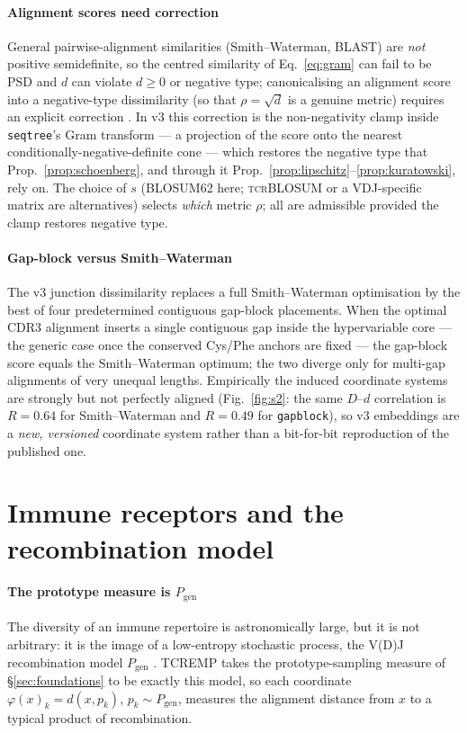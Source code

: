\documentclass[11pt]{article}
\theoremstyle{oldplain}
\theoremstyle{oldrem}
\newcommand{\Pgen}{P_{\mathrm{gen}}}
\newcommand{\code}[1]{\texttt{#1}}
\begin{document}
\paragraph{Alignment scores need correction} General pairwise-alignment similarities (Smith--Waterman,
BLAST) are \emph{not} positive semidefinite, so the centred similarity of Eq.~\eqref{eq:gram} can fail to
be {\scshape PSD} and $d$ can violate $d\ge 0$ or negative type; canonicalising an alignment score into a
negative-type dissimilarity (so that $\rho=\sqrt d$ is a genuine metric) requires an explicit correction
\cite{BlastMetric2025}. In v3 this correction is the non-negativity clamp inside \code{seqtree}'s Gram
transform --- a projection of the score onto the nearest conditionally-negative-definite cone --- which
restores the negative type that Prop.~\ref{prop:schoenberg}, and through it
Prop.~\ref{prop:lipschitz}--\ref{prop:kuratowski}, rely on. The choice of
$s$ (BLOSUM62 here; \textsc{tcrBLOSUM} or a {\scshape VDJ}-specific matrix are alternatives) selects
\emph{which} metric $\rho$; all are admissible provided the clamp restores negative type.

\paragraph{Gap-block versus Smith--Waterman} The v3 junction dissimilarity replaces a full Smith--Waterman
optimisation by the best of four predetermined contiguous gap-block placements. When the optimal CDR3
alignment inserts a single contiguous gap inside the hypervariable core --- the generic case once the
conserved Cys/Phe anchors are fixed --- the gap-block score equals the Smith--Waterman optimum; the two
diverge only for multi-gap alignments of very unequal lengths. Empirically the induced coordinate systems
are strongly but not perfectly aligned (Fig.~\ref{fig:s2}: the same $D$--$d$ correlation is $R=0.64$ for
Smith--Waterman and $R=0.49$ for \code{gapblock}), so v3 embeddings are a \emph{new, versioned}
coordinate system rather than a bit-for-bit reproduction of the published one.

\section{Immune receptors and the recombination model}\label{sec:immune}

\paragraph{The prototype measure is $\Pgen$} The diversity of an immune repertoire is astronomically
large, but it is not arbitrary: it is the image of a low-entropy stochastic process, the V(D)J
recombination model $\Pgen$ \cite{Murugan2012,Marcou2018,Sethna2019}. {\scshape TCREMP} takes the
prototype-sampling measure of \S\ref{sec:foundations} to be exactly this model, so each coordinate
$\varphi(x)_k = d(x,p_k)$, $p_k\sim\Pgen$, measures the alignment distance from $x$ to a typical product
of recombination.
\end{document}
